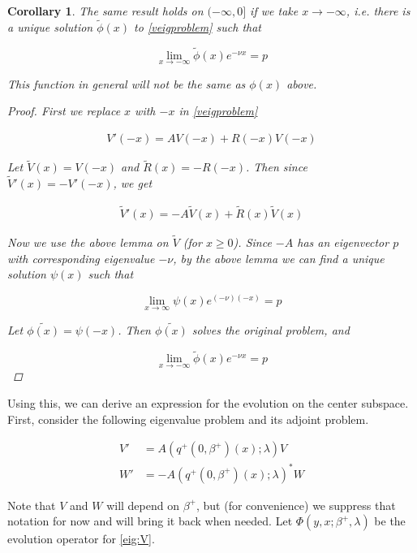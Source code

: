 \documentclass[12pt]{article}
\newtheorem{corollary}{Corollary}
\begin{document}
\begin{corollary}The same result holds on $(-\infty, 0]$ if we take $x \rightarrow -\infty$, i.e. there is a unique solution $\tilde{\phi}(x)$ to \eqref{veigproblem} such that 

\[
\lim_{x\rightarrow -\infty} \tilde{\phi}(x) e^{-\nu x} = p
\]

This function in general will not be the same as $\phi(x)$ above.

\begin{proof}
First we replace $x$ with $-x$ in \eqref{veigproblem}

\begin{align*}
V'(-x) = A V(-x) + R(-x)V(-x)
\end{align*}

Let $\tilde{V}(x) = V(-x)$ and $\tilde{R}(x) = -R(-x)$. Then since $\tilde{V}'(x) = -V'(-x)$, we get

\begin{align*}
\tilde{V}'(x) = -A \tilde{V}(x) + \tilde{R}(x)\tilde{V}(x)
\end{align*}

Now we use the above lemma on $\tilde{V}$ (for $x \geq 0$). Since $-A$ has an eigenvector $p$ with corresponding eigenvalue $-\nu$, by the above lemma we can find a unique solution $\psi(x)$ such that 

\[
\lim_{x\rightarrow \infty} \psi(x) e^{(-\nu)(-x)} = p
\]

Let $\tilde{\phi(x)} = \psi(-x)$. Then $\tilde{\phi(x)}$ solves the original problem, and

\[
\lim_{x\rightarrow -\infty} \tilde{\phi}(x) e^{-\nu x } = p
\]

\end{proof}
\end{corollary}

Using this, we can derive an expression for the evolution on the center subspace. First, consider the following eigenvalue problem and its adjoint problem.

\begin{align}
V' &= A(q^+(0, \beta^+)(x); \lambda) V \label{eig:V} \\
W' &= -A(q^+(0, \beta^+)(x); \lambda)^* W \label{eig:W}
\end{align}

Note that $V$ and $W$ will depend on $\beta^+$, but (for convenience) we suppress that notation for now and will bring it back when needed. Let $\Phi(y, x; \beta^+, \lambda)$ be the evolution operator for \eqref{eig:V}.\\
\end{document}
